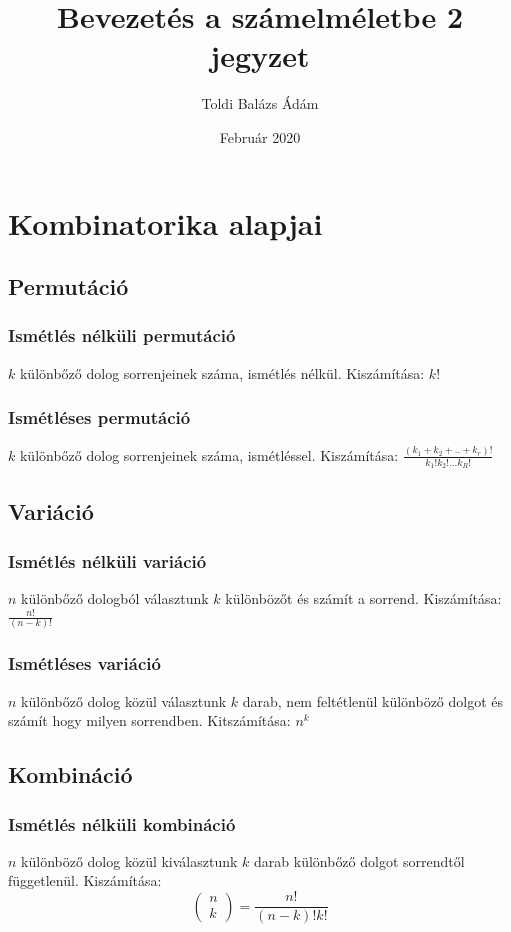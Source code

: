 \documentclass[12pt,a4paper,twoside]{report}
\title{Bevezetés a számelméletbe 2 jegyzet}
\author{Toldi Balázs Ádám }
\date{Február 2020}
\begin{document}
	
\maketitle
\tableofcontents
\newpage
\section{Kombinatorika alapjai}
\subsection{Permutáció}
\subsubsection{Ismétlés nélküli permutáció}
$k$ különbőző dolog sorrenjeinek száma, ismétlés nélkül.
Kiszámítása: $k!$
\subsubsection{Ismétléses permutáció}
$k$ különbőző dolog sorrenjeinek száma, ismétléssel.
Kiszámítása: $\frac{(k_1+k_2+..+k_r)!}{k_1!k_2!...k_R!}$
\subsection{Variáció}
\subsubsection{Ismétlés nélküli variáció}
$n$ különbőző dologból választunk $k$ különbözőt és számít a sorrend.
Kiszámítása:$\frac{n!}{(n-k)!}$
\subsubsection{Ismétléses variáció}
$n$ különbőző dolog közül választunk $k$ darab, nem feltétlenül különböző dolgot és számít hogy milyen sorrendben.
Kitszámítása: $n^k$
\subsection{Kombináció}
\subsubsection{Ismétlés nélküli kombináció}
$n$ különböző dolog közül kiválasztunk $k$ darab különbőző dolgot sorrendtől függetlenül. 
Kiszámítása: 
\begin{equation*}
\begin{pmatrix}
 n\\
 k
\end{pmatrix}
=\frac{n!}{(n-k)!k!}
\end{equation*}
\end{document}
